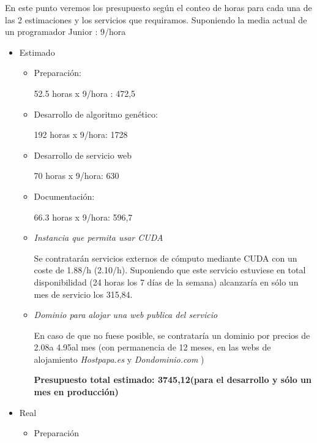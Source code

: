 En este punto veremos los presupuesto según el conteo de horas para cada una de las 2 estimaciones y los servicios que requiramos. Suponiendo la media actual de un programador Junior \cite{sueldos}: 9\officialeuro/hora


\bigskip
\begin{itemize}
	
	\item Estimado
	\begin{itemize}
		\item Preparación: 
		
		52.5 horas x 9\officialeuro/hora : 472,5\officialeuro
		
		\item Desarrollo de algoritmo genético: 
		
		192 horas x 9\officialeuro/hora: 1728\officialeuro
		
		\item Desarrollo de servicio web
		
		70 horas x 9\officialeuro/hora: 630\officialeuro
		
		\item Documentación: 

		66.3 horas x 9\officialeuro/hora: 596,7\officialeuro
		
		\item \textit{Instancia que permita usar CUDA}
		
		Se contratarán servicios externos de cómputo mediante CUDA \cite{amazoncuda} con un coste de 1.88\officialeuro/h (2.10\textdollar/h). Suponiendo que este servicio estuviese en total disponibilidad (24 horas los 7 días de la semana) alcanzaría en sólo un mes de servicio los 315,84\officialeuro.
		
		\item \textit{Dominio para alojar una web publica del servicio}
		
		En caso de que no fuese posible, se contrataría un dominio por precios de 2.08\officialeuro a 4.95\officialeuro al mes (con permanencia de 12 meses, en las webs de alojamiento \textit{Hostpapa.es} \cite{hostpapa} y \textit{Dondominio.com} \cite{dondominio})
		
		\bigskip
		\textbf{Presupuesto total estimado: 3745,12\officialeuro (para el desarrollo y sólo un mes en producción) }
		
	\end{itemize}
	
	\item Real
	\begin{itemize}
		\item Preparación
		

\end{itemize}
\end{itemize}
